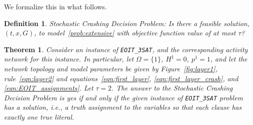 \documentclass[11pt]{article}
\newtheorem{theorem}{Theorem}
\newtheorem{definition}{Definition}
\begin{document}
	We formalize this in what follows.
	\begin{definition}
		{\sc Stochastic Crashing Decision Problem:} Is there a feasible solution, $(t,x,G)$, to model~\eqref{prob:extensive} with objective function value of at most $\tau$?
	\end{definition}
	\begin{theorem}\label{thm:npcomplete}
		Consider an instance of \verb|EOIT_3SAT|, and the corresponding activity network for this instance. In particular, let \(\Omega = \{1\}\), \(H^1 = 0\), $p^1=1$, and let the network topology and model parameters be given by Figure~\ref{fig:layer1}, rule~\eqref{eqn:layer2} and equations~\eqref{eqn:first_layer}, \eqref{eqn:first_layer_crash}, and \eqref{eqn:EOIT_assignments}. Let \(\tau = 2\). The answer to the {\sc Stochastic Crashing Decision Problem} is yes if and only if the given instance of \verb|EOIT_3SAT| problem has a solution, i.e., a truth assignment to the variables so that each clause has exactly one true literal.
	\end{theorem}
\end{document}
